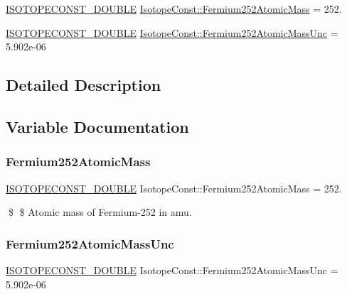 \begin{DoxyCompactItemize}
\item 
\mbox{\hyperlink{group___isotope_const-_macros_ga8f45a7272ce02c0b4c65c44636ed719a}{I\+S\+O\+T\+O\+P\+E\+C\+O\+N\+S\+T\+\_\+\+D\+O\+U\+B\+LE}} \mbox{\hyperlink{group___isotope_const-_fermium-_fm252_gaa886206431d9338e584c8889a4943b7c}{Isotope\+Const\+::\+Fermium252\+Atomic\+Mass}} = 252.
\item 
\mbox{\hyperlink{group___isotope_const-_macros_ga8f45a7272ce02c0b4c65c44636ed719a}{I\+S\+O\+T\+O\+P\+E\+C\+O\+N\+S\+T\+\_\+\+D\+O\+U\+B\+LE}} \mbox{\hyperlink{group___isotope_const-_fermium-_fm252_ga8a3f8a4ff100748b9ddc852efe6cd2de}{Isotope\+Const\+::\+Fermium252\+Atomic\+Mass\+Unc}} = 5.\+902e-\/06
\end{DoxyCompactItemize}


\subsection{Detailed Description}


\subsection{Variable Documentation}
\mbox{\label{group___isotope_const-_fermium-_fm252_gaa886206431d9338e584c8889a4943b7c}} 
\subsubsection{\texorpdfstring{Fermium252\+Atomic\+Mass}{Fermium252AtomicMass}}
{\footnotesize\ttfamily \mbox{\hyperlink{group___isotope_const-_macros_ga8f45a7272ce02c0b4c65c44636ed719a}{I\+S\+O\+T\+O\+P\+E\+C\+O\+N\+S\+T\+\_\+\+D\+O\+U\+B\+LE}} Isotope\+Const\+::\+Fermium252\+Atomic\+Mass = 252.}

\$ \$ Atomic mass of Fermium-\/252 in amu. \mbox{\label{group___isotope_const-_fermium-_fm252_ga8a3f8a4ff100748b9ddc852efe6cd2de}} 
\subsubsection{\texorpdfstring{Fermium252\+Atomic\+Mass\+Unc}{Fermium252AtomicMassUnc}}
{\footnotesize\ttfamily \mbox{\hyperlink{group___isotope_const-_macros_ga8f45a7272ce02c0b4c65c44636ed719a}{I\+S\+O\+T\+O\+P\+E\+C\+O\+N\+S\+T\+\_\+\+D\+O\+U\+B\+LE}} Isotope\+Const\+::\+Fermium252\+Atomic\+Mass\+Unc = 5.\+902e-\/06}


